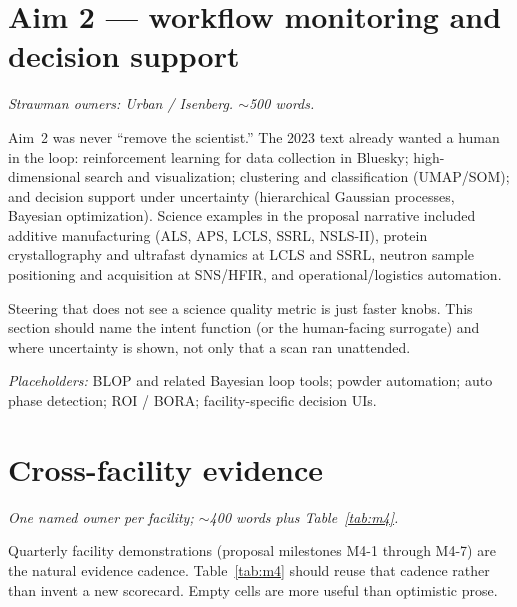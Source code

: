 \documentclass{iucrjournals}
\begin{document}


\section{Aim 2 --- workflow monitoring and decision support}
\label{sec:aim2}

\textit{Strawman owners: Urban / Isenberg. $\sim$500 words.}

Aim~2 was never ``remove the scientist.'' The 2023 text already wanted a human
in the loop: reinforcement learning for data collection in Bluesky; high-dimensional
search and visualization; clustering and classification (UMAP/SOM); and
decision support under uncertainty (hierarchical Gaussian processes, Bayesian
optimization). Science examples in the proposal narrative included additive
manufacturing (ALS, APS, LCLS, SSRL, NSLS-II), protein crystallography and
ultrafast dynamics at LCLS and SSRL, neutron sample positioning and acquisition
at SNS/HFIR, and operational/logistics automation.

Steering that does not see a science quality metric is just faster knobs. This
section should name the intent function (or the human-facing surrogate) and
where uncertainty is shown, not only that a scan ran unattended.

\textit{Placeholders:} BLOP and related Bayesian loop tools; powder
automation; auto phase detection; ROI / BORA; facility-specific decision UIs.



\section{Cross-facility evidence}
\label{sec:evidence}

\textit{One named owner per facility; $\sim$400 words plus Table~\ref{tab:m4}.}

Quarterly facility demonstrations (proposal milestones M4-1 through M4-7) are
the natural evidence cadence. Table~\ref{tab:m4} should reuse that cadence
rather than invent a new scorecard. Empty cells are more useful than optimistic
prose.
\end{document}
